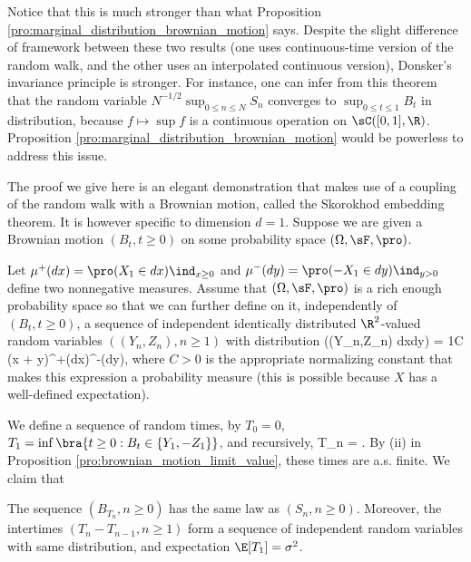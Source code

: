 Notice that this is much stronger than what Proposition \ref{pro:marginal_distribution_brownian_motion} says. Despite the slight difference of framework between these two results (one uses \cadlag continuous-time version of the random walk, and the other uses an interpolated continuous version), Donsker's invariance principle is stronger. For instance, one can infer from this theorem that the random variable $N^{-1/2} \sup_{0\leq n\leq N} S_n$ converges to $\sup_{0\leq t\leq 1} B_t$ in distribution, because $f \mapsto \sup f$ is a continuous operation on $\sC([0, 1],\R)$. Proposition \ref{pro:marginal_distribution_brownian_motion} would be powerless to address this issue.

The proof we give here is an elegant demonstration that makes use of a coupling of the random walk with a Brownian motion, called the Skorokhod embedding theorem. It is however specific to dimension $d = 1$. Suppose we are given a Brownian motion $(B_t, t \geq 0)$ on some probability space $(\Omega,\sF, \pro)$.

Let $\mu^+(dx) = \pro(X_1 \in dx)\ind_{x\geq0 }$ and $\mu^-(dy) = \pro(-X_1 \in dy)\ind_{y>0}$ define two nonnegative measures. Assume that $(\Omega,\sF,\pro)$ is a rich enough probability space so that we can further define on it, independently of $(B_t, t \geq 0)$, a sequence of independent identically
distributed $\R^2$-valued random variables $((Y_n,Z_n), n \geq 1)$ with distribution
\be
\pro((Y_n,Z_n) \in dxdy) = \frac 1C (x + y)\mu^+(dx)\mu^-(dy),
\ee
where $C > 0$ is the appropriate normalizing constant that makes this expression a probability measure (this is possible because $X$ has a well-defined expectation).

We define a sequence of random times, by $T_0 = 0$, $T_1 = \inf\bra{t \geq 0: B_t \in \{Y_1,-Z_1\}}$, and recursively,
\be
T_n = \inf{}.
\ee
By (ii) in Proposition \ref{pro:brownian_motion_limit_value}, these times are a.s. finite. We claim that


\begin{lemma}\label{lem:skorokhod_embedding}
The sequence $(B_{T_n}, n \geq 0)$ has the same law as $(S_n, n \geq 0)$. Moreover, the intertimes $(T_n - T_{n-1}, n \geq 1)$ form a sequence of independent random variables with same distribution, and expectation $\E[T_1] = \sigma^2$.
\end{lemma}

